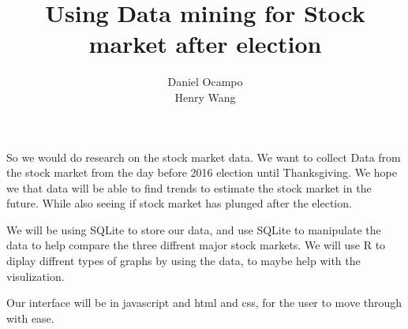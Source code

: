 \documentclass{article}
\begin{document}
\title{Using Data mining for Stock market after election} 
\author{Daniel Ocampo\\ Henry Wang}
\maketitle

So we would do research on the stock market data. We want to collect Data from the stock market from the day before 2016 election until Thanksgiving. We hope we that data will be able to find trends to estimate the stock market in the future. While also seeing if stock market has plunged after the election.

\par We will be using SQLite to store our data, and use SQLite to manipulate the data to help compare the three diffrent major stock markets. We will use R to diplay diffrent types of graphs by using the data, to maybe help with the visulization. 

\par Our interface will be in javascript and html and css, for the user to move through with ease.
\end{document}
